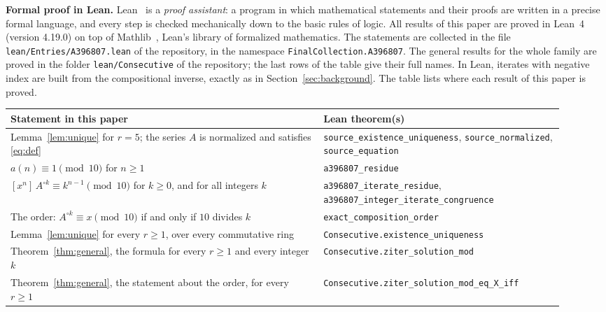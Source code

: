 \documentclass[11pt,a4paper]{article}
\theoremstyle{definition}
\theoremstyle{remark}
\newcommand{\coeff}[2]{[x^{#1}]\,#2}
\newcommand{\para}[1]{\par\medskip\noindent\textbf{#1}\enspace}
\begin{document}
\para{Formal proof in Lean.}
Lean~\cite{lean} is a \emph{proof assistant}: a program in which mathematical statements and their proofs are written
in a precise formal language, and every step is checked mechanically down to the basic rules of logic. All results of
this paper are proved in Lean~4 (version 4.19.0) on top of Mathlib~\cite{mathlib}, Lean's library of formalized
mathematics. The statements are collected in the file \texttt{lean/Entries/A396807.lean} of the repository,
in the namespace \texttt{FinalCollection.A396807}. The general results for the whole family are proved in the folder \texttt{lean/Consecutive} of the
repository; the last rows of the table give their full names. In Lean, iterates with negative index are built from the
compositional inverse, exactly as in Section~\ref{sec:background}.
The table lists where each result of this paper is proved.
\begin{center}\small\renewcommand{\arraystretch}{1.25}
\begin{tabular}{>{\raggedright\arraybackslash}p{0.52\linewidth}>{\raggedright\arraybackslash}p{0.4\linewidth}}
\toprule
Statement in this paper & Lean theorem(s)\\
\midrule
Lemma~\ref{lem:unique} for $r=5$; the series $A$ is normalized and satisfies \eqref{eq:def} & \texttt{source\_\allowbreak{}existence\_\allowbreak{}uniqueness}, \texttt{source\_\allowbreak{}normalized}, \texttt{source\_\allowbreak{}equation} \\
$a(n)\equiv1\pmod{10}$ for $n\ge1$ & \texttt{a396807\_\allowbreak{}residue} \\
$\coeff{n}{A^{\circ k}}\equiv k^{n-1}\pmod{10}$ for $k\ge0$, and for all integers $k$ & \texttt{a396807\_\allowbreak{}iterate\_\allowbreak{}residue}, \texttt{a396807\_\allowbreak{}integer\_\allowbreak{}iterate\_\allowbreak{}congruence} \\
The order: $A^{\circ k}\equiv x\pmod{10}$ if and only if $10$ divides $k$ & \texttt{exact\_\allowbreak{}composition\_\allowbreak{}order} \\
Lemma~\ref{lem:unique} for every $r\ge1$, over every commutative ring & \texttt{Consecutive.existence\_\allowbreak{}uniqueness} \\
Theorem~\ref{thm:general}, the formula for every $r\ge1$ and every integer $k$ & \texttt{Consecutive.ziter\_\allowbreak{}solution\_\allowbreak{}mod} \\
Theorem~\ref{thm:general}, the statement about the order, for every $r\ge1$ & \texttt{Consecutive.ziter\_\allowbreak{}solution\_\allowbreak{}mod\_\allowbreak{}eq\_\allowbreak{}X\_\allowbreak{}iff} \\
\bottomrule
\end{tabular}
\end{center}
\end{document}
